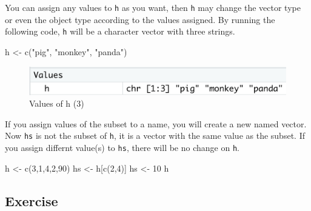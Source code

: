 \documentclass[
]{book}
\newenvironment{Shaded}{\begin{snugshade}}{\end{snugshade}}
\newcommand{\DecValTok}[1]{\textcolor[rgb]{0.00,0.00,0.81}{#1}}
\newcommand{\FunctionTok}[1]{\textcolor[rgb]{0.00,0.00,0.00}{#1}}
\newcommand{\NormalTok}[1]{#1}
\newcommand{\OtherTok}[1]{\textcolor[rgb]{0.56,0.35,0.01}{#1}}
\newcommand{\StringTok}[1]{\textcolor[rgb]{0.31,0.60,0.02}{#1}}
\newenvironment{infobox}[1]
  {
  \begin{itemize}
  \renewcommand{\labelitemi}{
    \raisebox{-.7\height}[0pt][0pt]{
      {\setkeys{Gin}{width=3em,keepaspectratio}
        \texttt{[image: pics/\#1]}}
    }
  }
  \setlength{\fboxsep}{1em}
  \begin{blackbox}
  \item
  }
  {
  \end{blackbox}
  \end{itemize}
  }
\newenvironment{blackbox}{
  \definecolor{shadecolor}{rgb}{0, 0, 0}  %
  \color{white}
  \begin{shaded}}
 {\end{shaded}}
\begin{document}
You can assign any values to \texttt{h} as you want, then \texttt{h} may change the vector type or even the object type according to the values assigned. By running the following code, \texttt{h} will be a character vector with three strings.

\begin{Shaded}
\begin{Highlighting}[]
\NormalTok{h }\OtherTok{\textless{}{-}} \FunctionTok{c}\NormalTok{(}\StringTok{"pig"}\NormalTok{, }\StringTok{"monkey"}\NormalTok{, }\StringTok{"panda"}\NormalTok{)}
\end{Highlighting}
\end{Shaded}

\begin{figure}

{\centering \includegraphics[width=0.7\linewidth]{pics/2h3} 

}

\caption{Values of h (3)}\label{fig:h3}
\end{figure}

\begin{infobox}{caution}

If you assign values of the subset to a name, you will create a new named vector. Now \texttt{hs} is not the subset of \texttt{h}, it is a vector with the same value as the subset. If you assign differnt value(s) to \texttt{hs}, there will be no change on \texttt{h}.

\begin{Shaded}
\begin{Highlighting}[]
\NormalTok{h }\OtherTok{\textless{}{-}} \FunctionTok{c}\NormalTok{(}\DecValTok{3}\NormalTok{,}\DecValTok{1}\NormalTok{,}\DecValTok{4}\NormalTok{,}\DecValTok{2}\NormalTok{,}\DecValTok{90}\NormalTok{)}
\NormalTok{hs }\OtherTok{\textless{}{-}}\NormalTok{ h[}\FunctionTok{c}\NormalTok{(}\DecValTok{2}\NormalTok{,}\DecValTok{4}\NormalTok{)]}
\NormalTok{hs }\OtherTok{\textless{}{-}} \DecValTok{10}
\NormalTok{h}
\end{Highlighting}
\end{Shaded}

\end{infobox}

\hypertarget{exercise-6}{%
\subsection{Exercise}\label{exercise-6}}
\end{document}
